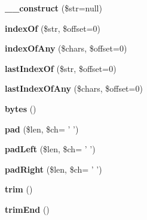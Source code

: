 \begin{DoxyCompactItemize}
\item 
\hypertarget{classString_a0b799cf9b80e4cff537c1f97782f96fd}{
{\bfseries \_\-\_\-construct} (\$str=null)}
\label{classString_a0b799cf9b80e4cff537c1f97782f96fd}

\item 
\hypertarget{classString_a5069041d10f95e4ec9a4be3cd17ab180}{
{\bfseries indexOf} (\$str, \$offset=0)}
\label{classString_a5069041d10f95e4ec9a4be3cd17ab180}

\item 
\hypertarget{classString_a1c8a1df4030974f7ae48f59c1a9dca80}{
{\bfseries indexOfAny} (\$chars, \$offset=0)}
\label{classString_a1c8a1df4030974f7ae48f59c1a9dca80}

\item 
\hypertarget{classString_a18806fe790375032e3fb268f649914d7}{
{\bfseries lastIndexOf} (\$str, \$offset=0)}
\label{classString_a18806fe790375032e3fb268f649914d7}

\item 
\hypertarget{classString_adbe9cb0e51c46bd16881923a7a3d2e4a}{
{\bfseries lastIndexOfAny} (\$chars, \$offset=0)}
\label{classString_adbe9cb0e51c46bd16881923a7a3d2e4a}

\item 
\hypertarget{classString_ae7254778c39de64320813d1da9f2f276}{
{\bfseries bytes} ()}
\label{classString_ae7254778c39de64320813d1da9f2f276}

\item 
\hypertarget{classString_aa8542443a25479d810d0c580680f685d}{
{\bfseries pad} (\$len, \$ch= ' ')}
\label{classString_aa8542443a25479d810d0c580680f685d}

\item 
\hypertarget{classString_ae39386e13e0e87cff555bfaea20ce656}{
{\bfseries padLeft} (\$len, \$ch= ' ')}
\label{classString_ae39386e13e0e87cff555bfaea20ce656}

\item 
\hypertarget{classString_a8ab0df0a7bbe4d99b84356403abf946f}{
{\bfseries padRight} (\$len, \$ch= ' ')}
\label{classString_a8ab0df0a7bbe4d99b84356403abf946f}

\item 
\hypertarget{classString_ac3a075e35b0f39698230957bc7d0172d}{
{\bfseries trim} ()}
\label{classString_ac3a075e35b0f39698230957bc7d0172d}

\item 
\hypertarget{classString_a316e68c5acc7716e4aac01c78a1b5063}{
{\bfseries trimEnd} ()}
\label{classString_a316e68c5acc7716e4aac01c78a1b5063}


\end{DoxyCompactItemize}
